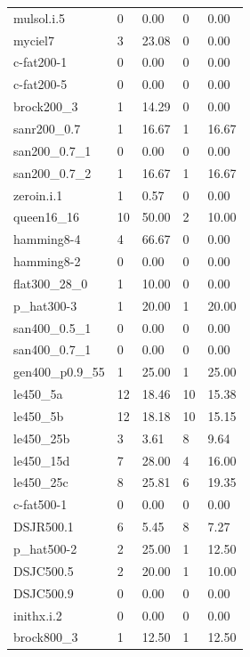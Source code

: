 \begin{table}[h!]
{\begin{tabular}{lllll}
            mulsol.i.5 & 0 & 0.00 & 0 & 0.00 \\
            myciel7 & 3 & 23.08 & 0 & 0.00 \\
            c-fat200-1 & 0 & 0.00 & 0 & 0.00 \\
            c-fat200-5 & 0 & 0.00 & 0 & 0.00 \\
            brock200\_3 & 1 & 14.29 & 0 & 0.00 \\
            sanr200\_0.7 & 1 & 16.67 & 1 & 16.67 \\
            san200\_0.7\_1 & 0 & 0.00 & 0 & 0.00 \\
            san200\_0.7\_2 & 1 & 16.67 & 1 & 16.67 \\
            zeroin.i.1 & 1 & 0.57 & 0 & 0.00 \\
            queen16\_16 & 10 & 50.00 & 2 & 10.00 \\
            hamming8-4 & 4 & 66.67 & 0 & 0.00 \\
            hamming8-2 & 0 & 0.00 & 0 & 0.00 \\
            flat300\_28\_0 & 1 & 10.00 & 0 & 0.00 \\
            p\_hat300-3 & 1 & 20.00 & 1 & 20.00 \\
            san400\_0.5\_1 & 0 & 0.00 & 0 & 0.00 \\
            san400\_0.7\_1 & 0 & 0.00 & 0 & 0.00 \\
            gen400\_p0.9\_55 & 1 & 25.00 & 1 & 25.00 \\
            le450\_5a & 12 & 18.46 & 10 & 15.38 \\
            le450\_5b & 12 & 18.18 & 10 & 15.15 \\
            le450\_25b & 3 & 3.61 & 8 & 9.64 \\
            le450\_15d & 7 & 28.00 & 4 & 16.00 \\
            le450\_25c & 8 & 25.81 & 6 & 19.35 \\
            c-fat500-1 & 0 & 0.00 & 0 & 0.00 \\
            DSJR500.1 & 6 & 5.45 & 8 & 7.27 \\
            p\_hat500-2 & 2 & 25.00 & 1 & 12.50 \\
            DSJC500.5 & 2 & 20.00 & 1 & 10.00 \\
            DSJC500.9 & 0 & 0.00 & 0 & 0.00 \\
            inithx.i.2 & 0 & 0.00 & 0 & 0.00 \\
            brock800\_3 & 1 & 12.50 & 1 & 12.50 \\

\end{tabular}}
\end{table}
